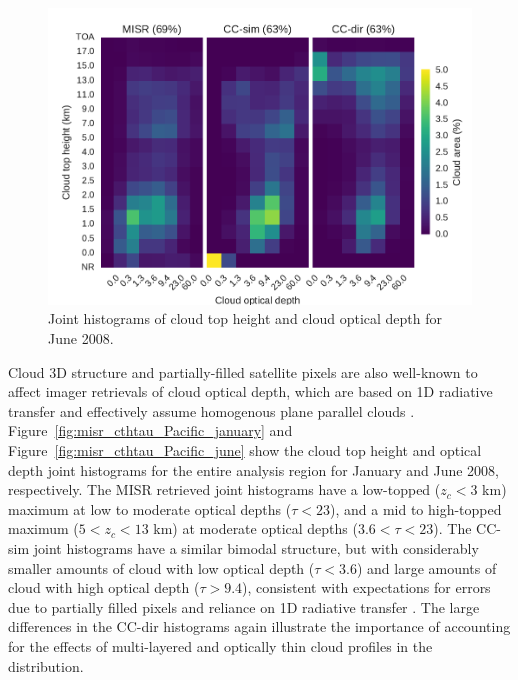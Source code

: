 \begin{figure}[htbp]
\centering
\includegraphics{graphics/misr_clmisr_Pacific_2008-06.pdf}
\caption{\label{fig:misr_cthtau_Pacific_june}Joint histograms of cloud
top height and cloud optical depth for June
2008.}\label{fig:misrux5fcthtauux5fPacificux5fjune}
\end{figure}

Cloud 3D structure and partially-filled satellite pixels are also
well-known to affect imager retrievals of cloud optical depth, which are
based on 1D radiative transfer and effectively assume homogenous plane
parallel clouds \citep{yang_and_digirolamo_2008, evans_et_al_2008}.
Figure~\ref{fig:misr_cthtau_Pacific_january} and
Figure~\ref{fig:misr_cthtau_Pacific_june} show the cloud top height and
optical depth joint histograms for the entire analysis region for
January and June 2008, respectively. The MISR retrieved joint histograms
have a low-topped (\(z_c < 3\) km) maximum at low to moderate optical
depths (\(\tau < 23\)), and a mid to high-topped maximum
(\(5 < z_c < 13\) km) at moderate optical depths (\(3.6 < \tau < 23\)).
The CC-sim joint histograms have a similar bimodal structure, but with
considerably smaller amounts of cloud with low optical depth
(\(\tau < 3.6\)) and large amounts of cloud with high optical depth
(\(\tau > 9.4\)), consistent with expectations for errors due to
partially filled pixels and reliance on 1D radiative transfer
\citep{marchand_et_al_2010}. The large differences in the CC-dir
histograms again illustrate the importance of accounting for the effects
of multi-layered and optically thin cloud profiles in the distribution.

